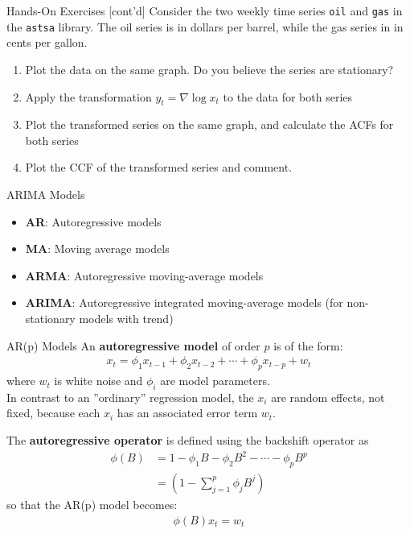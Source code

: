 \documentclass[ignorenonframetext,xcolor=x11names]{beamer}
\begin{document}
\begin{frame}{Hands-On Exercises \small [cont'd]}
Consider the two weekly time series \texttt{oil} and \texttt{gas} in the  \texttt{astsa} library. The oil series is in dollars per barrel, while the gas series in in cents per gallon.
\begin{enumerate}
   \item Plot the data on the same graph. Do you believe the series are stationary?
   \item Apply the transformation $y_t = \nabla \log x_t$ to the data for both series
   \item Plot the transformed series on the same graph, and calculate the ACFs for both series
   \item Plot the CCF of the transformed series and comment.
\end{enumerate}
\end{frame}

\begin{frame}{ARIMA Models}
\begin{itemize}
  \item \textbf{AR}: Autoregressive models
  \item \textbf{MA}: Moving average models
  \item \textbf{ARMA}: Autoregressive moving-average models
  \item \textbf{ARIMA}: Autoregressive integrated moving-average models (for non-stationary models with trend)
\end{itemize}
\end{frame}

\begin{frame}{AR(p) Models}
An \textbf{autoregressive model} of order $p$ is of the form:
\begin{align*}
x_t = \phi_1 x_{t-1} + \phi_2 x_{t-2} + \cdots + \phi_p x_{t-p} + w_t
\end{align*}
where $w_t$ is white noise and $\phi_i$ are model parameters. \\


\footnotesize
In contrast to an ''ordinary'' regression model, the $x_i$ are random effects, not fixed, because each $x_i$ has an associated error term $w_t$. \\
\normalsize

The \textbf{autoregressive operator} is defined using the backshift operator as 
\begin{align*}
\phi (B) &= 1 - \phi_1 B - \phi_2 B^2 - \cdots - \phi_p B^p \\
         &= \left(1 - \sum_{j=1}^p \phi_j B^j \right)
\end{align*}
so that the AR(p) model becomes:
\begin{align*}
\phi (B) x_t = w_t
\end{align*}
\end{frame}
\end{document}
